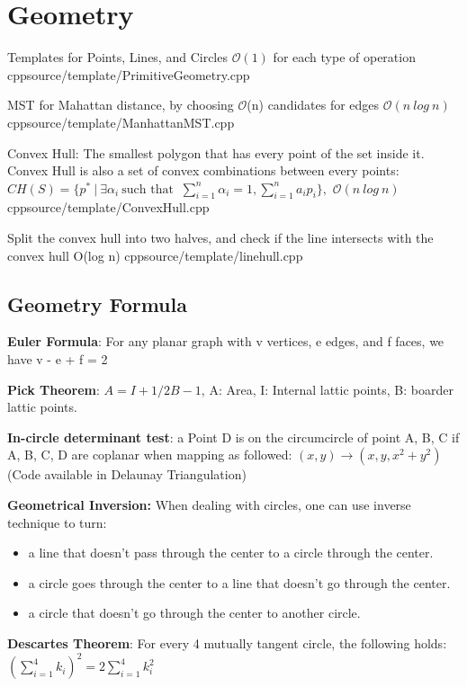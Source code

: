 \section{Geometry}
{Templates for Points, Lines, and Circles}
{$\mathcal{O}(1)$ for each type of operation}
{cpp}{source/template/PrimitiveGeometry.cpp}

{MST for Mahattan distance, by choosing $\mathcal{O}$(n) candidates for edges}
{$\mathcal{O}(n \ log \ n)$}
{cpp}{source/template/ManhattanMST.cpp}

{Convex Hull: The smallest polygon that has every point of the set inside it. Convex Hull is also a set of convex combinations between every points:
$CH(S) = \{ p^* \ | \ \exists \alpha_i \ \text{such that } \ \sum_{i=1}^n\alpha_i=1,\sum_{i=1}^na_ip_i\},$}
{$\mathcal{O}(n \ log \ n)$}
{cpp}{source/template/ConvexHull.cpp}

{Split the convex hull into two halves, and check if the line intersects with the convex hull}
{O(log n)}
{cpp}{source/template/linehull.cpp}

\subsection{Geometry Formula}
\textbf{Euler Formula}: For any planar graph with v vertices, e edges, and f faces, we have v - e + f = 2

\textbf{Pick Theorem}: $A = I + 1/2 B - 1$, A: Area, I: Internal lattic points, B: boarder lattic points.

\textbf{In-circle determinant test}: a Point D is on the circumcircle of point A, B, C if A, B, C, D are coplanar when mapping as followed: $(x, y) \to (x, y, x^2 + y^2)$ (Code available in Delaunay Triangulation)

\textbf{Geometrical Inversion:} When dealing with circles, one can use inverse technique to turn:
\begin{itemize}
    \item a line that doesn't pass through the center to a circle through the center.
    \item a circle goes through the center to a line that doesn't go through the center.
    \item a circle that doesn't go through the center to another circle.
\end{itemize}

\textbf{Descartes Theorem}: For every 4 mutually tangent circle, the following holds: $(\sum_{i=1}^4k_i)^2 = 2 \sum_{i=1}^4k_i^2$

